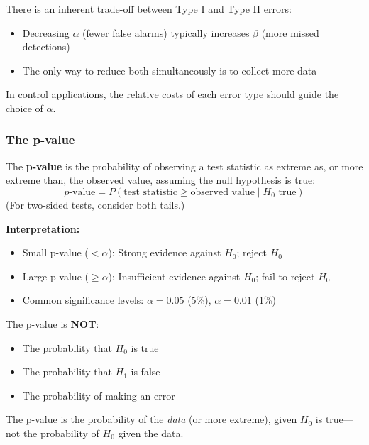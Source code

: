 \begin{warningbox}[title=Trade-off Between Error Types]
There is an inherent trade-off between Type I and Type II errors:
\begin{itemize}
    \item Decreasing $\alpha$ (fewer false alarms) typically increases $\beta$ (more missed detections)
    \item The only way to reduce both simultaneously is to collect more data
\end{itemize}
In control applications, the relative costs of each error type should guide the choice of $\alpha$.
\end{warningbox}

\subsubsection{The p-value}

\begin{definitionbox}[title=Definition: p-value]
The \textbf{p-value} is the probability of observing a test statistic as extreme as, or more extreme than, the observed value, assuming the null hypothesis is true:
\begin{equation}
p\text{-value} = P(\text{test statistic} \geq \text{observed value} \;|\; H_0 \text{ true})
\end{equation}
(For two-sided tests, consider both tails.)
\end{definitionbox}

\textbf{Interpretation:}
\begin{itemize}
    \item Small p-value ($< \alpha$): Strong evidence against $H_0$; reject $H_0$
    \item Large p-value ($\geq \alpha$): Insufficient evidence against $H_0$; fail to reject $H_0$
    \item Common significance levels: $\alpha = 0.05$ (5\%), $\alpha = 0.01$ (1\%)
\end{itemize}

\begin{warningbox}[title=Common Misinterpretations of p-values]
The p-value is \textbf{NOT}:
\begin{itemize}
    \item The probability that $H_0$ is true
    \item The probability that $H_1$ is false
    \item The probability of making an error
\end{itemize}
The p-value is the probability of the \textit{data} (or more extreme), given $H_0$ is true---not the probability of $H_0$ given the data.
\end{warningbox}

